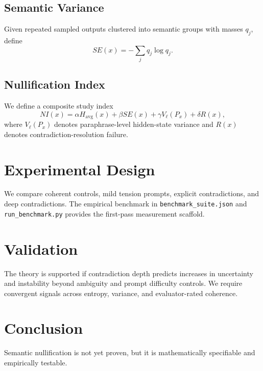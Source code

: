 \documentclass[11pt]{article}
\begin{document}
\subsection{Semantic Variance}
Given repeated sampled outputs clustered into semantic groups with masses $q_j$, define
\[
SE(x) = -\sum_j q_j \log q_j.
\]

\subsection{Nullification Index}
We define a composite study index
\[
NI(x) = \alpha H_{\mathrm{avg}}(x) + \beta SE(x) + \gamma V_\ell(P_x) + \delta R(x),
\]
where $V_\ell(P_x)$ denotes paraphrase-level hidden-state variance and $R(x)$ denotes contradiction-resolution failure.

\section{Experimental Design}
We compare coherent controls, mild tension prompts, explicit contradictions, and deep contradictions. The empirical benchmark in \texttt{benchmark\_suite.json} and \texttt{run\_benchmark.py} provides the first-pass measurement scaffold.

\section{Validation}
The theory is supported if contradiction depth predicts increases in uncertainty and instability beyond ambiguity and prompt difficulty controls. We require convergent signals across entropy, variance, and evaluator-rated coherence.

\section{Conclusion}
Semantic nullification is not yet proven, but it is mathematically specifiable and empirically testable.

\nocite{*}


\end{document}
